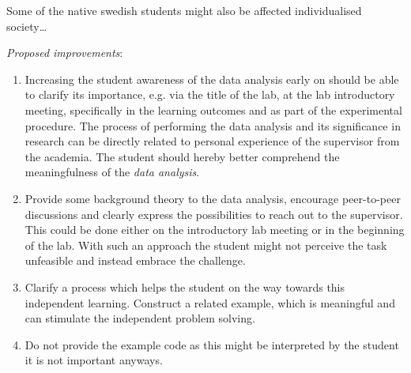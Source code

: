 \documentclass[]{article}
\begin{document}
Some of the native swedish students might also be affected individualised society\dots


{\it Proposed improvements}:
\begin{enumerate}
  \item Increasing the student awareness of the data analysis early on should be able to clarify its importance, e.g. via the title of the lab, at the lab introductory meeting, specifically in the learning outcomes and as part of the experimental procedure.
The process of performing the data analysis and its significance in research can be directly related to personal experience of the supervisor from the academia.
The student should hereby better comprehend the meaningfulness of the {\it data analysis}.
 \item Provide some background theory to the data analysis, encourage peer-to-peer discussions and clearly express the possibilities to reach out to the supervisor.
This could be done either on the introductory lab meeting or in the beginning of the lab.
With such an approach the student might not perceive the task unfeasible and instead embrace the challenge.
  \item Clarify a process which helps the student on the way towards this independent learning.
Construct a related example, which is meaningful and can stimulate the independent problem solving.
  \item Do not provide the example code as this might be interpreted by the student it is not important anyways.
\end{enumerate}




\end{document}

